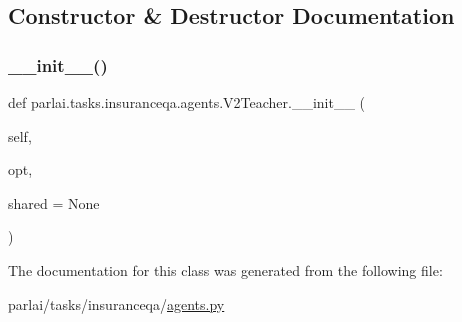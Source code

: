 \subsection{Constructor \& Destructor Documentation}
\mbox{\label{classparlai_1_1tasks_1_1insuranceqa_1_1agents_1_1V2Teacher_aff5c049cb85ce4a1af8304373c908975}} 
\subsubsection{\texorpdfstring{\+\_\+\+\_\+init\+\_\+\+\_\+()}{\_\_init\_\_()}}
{\footnotesize\ttfamily def parlai.\+tasks.\+insuranceqa.\+agents.\+V2\+Teacher.\+\_\+\+\_\+init\+\_\+\+\_\+ (\begin{DoxyParamCaption}\item[{}]{self,  }\item[{}]{opt,  }\item[{}]{shared = {\ttfamily None} }\end{DoxyParamCaption})}



The documentation for this class was generated from the following file\+:\begin{DoxyCompactItemize}
\item 
parlai/tasks/insuranceqa/\hyperlink{parlai_2tasks_2insuranceqa_2agents_8py}{agents.\+py}\end{DoxyCompactItemize}
